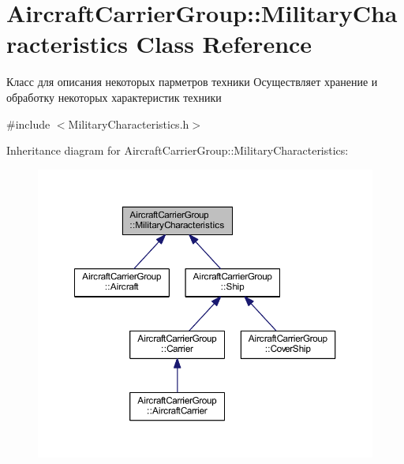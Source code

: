 \hypertarget{class_aircraft_carrier_group_1_1_military_characteristics}{}\section{Aircraft\+Carrier\+Group\+:\+:Military\+Characteristics Class Reference}
\label{class_aircraft_carrier_group_1_1_military_characteristics}


Класс для описания некоторых парметров техники  Осуществляет хранение и обработку некоторых характеристик техники  




{\ttfamily \#include $<$Military\+Characteristics.\+h$>$}



Inheritance diagram for Aircraft\+Carrier\+Group\+:\+:Military\+Characteristics\+:
\nopagebreak
\begin{figure}[H]
\begin{center}
\leavevmode
\includegraphics[width=350pt]{class_aircraft_carrier_group_1_1_military_characteristics__inherit__graph}
\end{center}
\end{figure}

